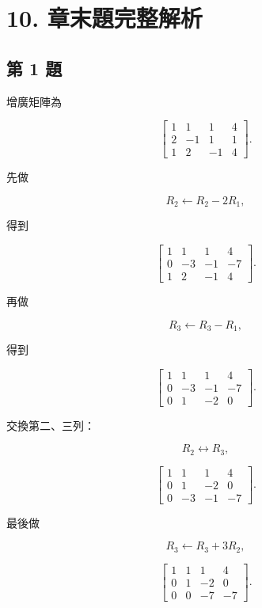 \documentclass[11pt,a4paper]{article}
\begin{document}
\section{10. 章末題完整解析}\label{ux7ae0ux672bux984cux5b8cux6574ux89e3ux6790}

\subsection{第 1 題}\label{ux7b2c-1-ux984c}

增廣矩陣為

\[
\left[
\begin{array}{ccc|c}
1&1&1&4\\
2&-1&1&1\\
1&2&-1&4
\end{array}
\right].
\]

先做

\[
R_2\leftarrow R_2-2R_1,
\]

得到

\[
\left[
\begin{array}{ccc|c}
1&1&1&4\\
0&-3&-1&-7\\
1&2&-1&4
\end{array}
\right].
\]

\clearpage

再做

\[
R_3\leftarrow R_3-R_1,
\]

得到

\[
\left[
\begin{array}{ccc|c}
1&1&1&4\\
0&-3&-1&-7\\
0&1&-2&0
\end{array}
\right].
\]

交換第二、三列：

\[
R_2\leftrightarrow R_3,
\]

\[
\left[
\begin{array}{ccc|c}
1&1&1&4\\
0&1&-2&0\\
0&-3&-1&-7
\end{array}
\right].
\]

最後做

\[
R_3\leftarrow R_3+3R_2,
\]

\[
\left[
\begin{array}{ccc|c}
1&1&1&4\\
0&1&-2&0\\
0&0&-7&-7
\end{array}
\right].
\]
\end{document}
